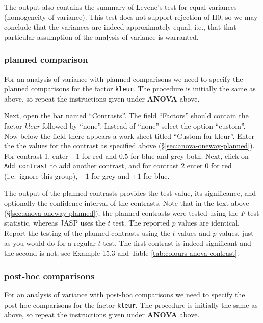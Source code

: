 \documentclass[
]{book}
\begin{document}
The output also contains the summary of Levene's test for equal variances (homogeneity of variance). This test does not support rejection of H0, so we may conclude that the variances are indeed approximately equal, i.e., that that particular assumption of the analysis of variance is warranted.

\hypertarget{planned-comparison-1}{%
\subsubsection{planned comparison}\label{planned-comparison-1}}

For an analysis of variance with planned comparisons we need to specify the planned comparisons for the factor \texttt{kleur}. The procedure is initially the same as above, so repeat the instructions given under \textbf{ANOVA} above.

Next, open the bar named ``Contrasts''. The field ``Factors'' should contain the factor \emph{kleur} followed by ``none''.
Instead of ``none'' select the option ``custom''. Now below the field there appears a work sheet titled ``Custom for kleur''. Enter the the values for the contrast as specified above (§\ref{sec:anova-oneway-planned}). For contrast 1, enter \(-1\) for red and \(0.5\) for blue and grey both. Next, click on \texttt{Add\ contrast} to add another contrast, and for contrast 2 enter \(0\) for red (i.e.~ignore this group), \(-1\) for grey and \(+1\) for blue.

The output of the planned contrasts provides the test value, its significance, and optionally the confidence interval of the contrasts. Note that in the text above (§\ref{sec:anova-oneway-planned}), the planned contrasts were tested using the \(F\) test statistic, whereas JASP uses the \(t\) test. The reported \(p\) values are identical. Report the testing of the planned contrasts using the \(t\) values and \(p\) values, just as you would do for a regular \(t\) test.
The first contrast is indeed significant and the second is not, see Example 15.3 and Table \ref{tab:colours-anova-contrast}.

\hypertarget{post-hoc-comparisons}{%
\subsubsection{post-hoc comparisons}\label{post-hoc-comparisons}}

For an analysis of variance with post-hoc comparisons we need to specify the post-hoc comparisons for the factor \texttt{kleur}. The procedure is initially the same as above, so repeat the instructions given under \textbf{ANOVA} above.
\end{document}
